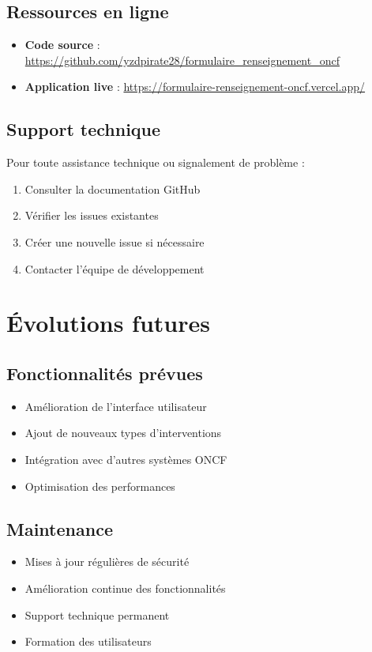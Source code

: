 \documentclass[12pt,a4paper]{report}
\begin{document}
\subsection{Ressources en ligne}
\begin{itemize}
    \item \textbf{Code source} : \url{https://github.com/yzdpirate28/formulaire_renseignement_oncf}
    \item \textbf{Application live} : \url{https://formulaire-renseignement-oncf.vercel.app/}
\end{itemize}

\subsection{Support technique}
Pour toute assistance technique ou signalement de problème :

\begin{enumerate}
    \item Consulter la documentation GitHub
    \item Vérifier les issues existantes
    \item Créer une nouvelle issue si nécessaire
    \item Contacter l'équipe de développement
\end{enumerate}

\section{Évolutions futures}

\subsection{Fonctionnalités prévues}
\begin{itemize}
    \item Amélioration de l'interface utilisateur
    \item Ajout de nouveaux types d'interventions
    \item Intégration avec d'autres systèmes ONCF
    \item Optimisation des performances
\end{itemize}

\subsection{Maintenance}
\begin{itemize}
    \item Mises à jour régulières de sécurité
    \item Amélioration continue des fonctionnalités
    \item Support technique permanent
    \item Formation des utilisateurs
\end{itemize}
\end{document}
